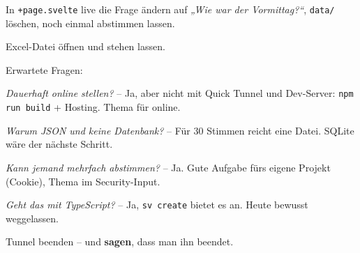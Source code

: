\begin{lecturer}
\begin{frame}{}
  \scriptsize
  \begin{tugitemize}
    \item In \texttt{+page.svelte} live die Frage ändern auf \emph{„Wie war der Vormittag?“},
          \texttt{data/} löschen, noch einmal abstimmen lassen.
    \item Excel-Datei öffnen und stehen lassen.
    \item Erwartete Fragen:
      \begin{tugitemize}
        \item \emph{Dauerhaft online stellen?} -- Ja, aber nicht mit Quick Tunnel und Dev-Server:
              \texttt{npm run build} + Hosting. Thema für online.
        \item \emph{Warum JSON und keine Datenbank?} -- Für 30 Stimmen reicht eine Datei. SQLite wäre der nächste Schritt.
        \item \emph{Kann jemand mehrfach abstimmen?} -- Ja. Gute Aufgabe fürs eigene Projekt (Cookie), Thema im Security-Input.
        \item \emph{Geht das mit TypeScript?} -- Ja, \texttt{sv create} bietet es an. Heute bewusst weggelassen.
      \end{tugitemize}
    \item Tunnel beenden -- und \textbf{sagen}, dass man ihn beendet.
  \end{tugitemize}
\end{frame}
\end{lecturer}

\switchtostandard
\begin{frame}[plain]
  \maketitle
\end{frame}



